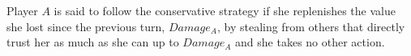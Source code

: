 {}
\begin{definition}
  Player $A$ is said to follow the conservative strategy if she replenishes the value she lost since the previous turn,
  $Damage_A$, by stealing from others that directly trust her as much as she can up to $Damage_A$ and she takes no other
  action.
\end{definition}
